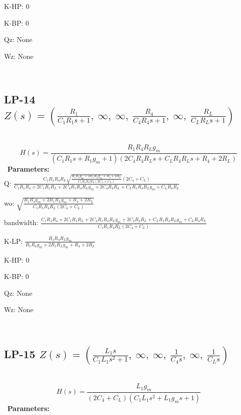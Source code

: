 \documentclass{article}
\begin{document}
K-HP: $0$\ 

K-BP: $0$\ 

Qz: $\text{None}$\ 

Wz: $\text{None}$\ 

\ 

\subsection{LP-14 $Z(s) = \left( \frac{R_{1}}{C_{1} R_{1} s + 1}, \  \infty, \  \infty, \  \frac{R_{4}}{C_{4} R_{4} s + 1}, \  \infty, \  \frac{R_{L}}{C_{L} R_{L} s + 1}\right)$ } \ 
\textbf{\[H(s) = \frac{R_{1} R_{4} R_{L} g_{m}}{\left(C_{1} R_{1} s + R_{1} g_{m} + 1\right) \left(2 C_{4} R_{4} R_{L} s + C_{L} R_{4} R_{L} s + R_{4} + 2 R_{L}\right)}\] } \ 
\textbf{Parameters:}\\ 

Q: $\frac{C_{1} R_{1} R_{4} R_{L} \sqrt{\frac{R_{1} R_{4} g_{m} + 2 R_{1} R_{L} g_{m} + R_{4} + 2 R_{L}}{C_{1} R_{1} R_{4} R_{L} \left(2 C_{4} + C_{L}\right)}} \left(2 C_{4} + C_{L}\right)}{C_{1} R_{1} R_{4} + 2 C_{1} R_{1} R_{L} + 2 C_{4} R_{1} R_{4} R_{L} g_{m} + 2 C_{4} R_{4} R_{L} + C_{L} R_{1} R_{4} R_{L} g_{m} + C_{L} R_{4} R_{L}}$\ 

wo: $\sqrt{\frac{R_{1} R_{4} g_{m} + 2 R_{1} R_{L} g_{m} + R_{4} + 2 R_{L}}{C_{1} R_{1} R_{4} R_{L} \left(2 C_{4} + C_{L}\right)}}$\ 

bandwidth: $\frac{C_{1} R_{1} R_{4} + 2 C_{1} R_{1} R_{L} + 2 C_{4} R_{1} R_{4} R_{L} g_{m} + 2 C_{4} R_{4} R_{L} + C_{L} R_{1} R_{4} R_{L} g_{m} + C_{L} R_{4} R_{L}}{C_{1} R_{1} R_{4} R_{L} \left(2 C_{4} + C_{L}\right)}$\ 

K-LP: $\frac{R_{1} R_{4} R_{L} g_{m}}{R_{1} R_{4} g_{m} + 2 R_{1} R_{L} g_{m} + R_{4} + 2 R_{L}}$\ 

K-HP: $0$\ 

K-BP: $0$\ 

Qz: $\text{None}$\ 

Wz: $\text{None}$\ 

\ 

\subsection{LP-15 $Z(s) = \left( \frac{L_{1} s}{C_{1} L_{1} s^{2} + 1}, \  \infty, \  \infty, \  \frac{1}{C_{4} s}, \  \infty, \  \frac{1}{C_{L} s}\right)$ } \ 
\textbf{\[H(s) = \frac{L_{1} g_{m}}{\left(2 C_{4} + C_{L}\right) \left(C_{1} L_{1} s^{2} + L_{1} g_{m} s + 1\right)}\] } \ 
\textbf{Parameters:}\\ 
\end{document}
